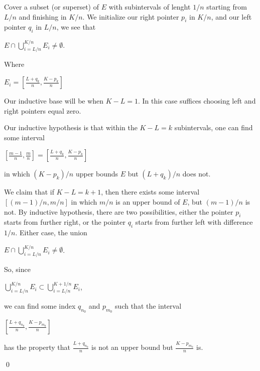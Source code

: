 \documentclass{article}
\theoremstyle{remark}
\begin{document}
\begin{enumerate}
            Cover a subset (or superset) of $E$ with subintervals of lenght $1/n$ starting from $L/n$ and finishing in $K/n$. We initialize our right pointer $p_i$ in $K/n$, and our left 
            pointer $q_i$ in $L/n$, we see that
            \begin{center}
                $\displaystyle E \cap \bigcup_{i=L/n}^{K/n} E_i \neq \emptyset$.
            \end{center}
            Where
            \begin{center}
                $\displaystyle E_i = \left[\frac{L+q_k}{n} , \frac{K-p_k}{n} \right]$
            \end{center}

            Our inductive base will be when $K-L = 1$. In this case suffices choosing left and right pointers equal zero.

            Our inductive hypothesis is that within the $K-L = k$ subintervals, one can find 
            some interval
            \begin{center}
                $\displaystyle \left[\frac{m-1}{n} , \frac{m}{n} \right] = \left[\frac{L+q_k}{n} , \frac{K-p_k}{n} \right]$
            \end{center}
            in which $(K-p_k)/n$ upper bounds $E$ but $(L+q_k)/n$ does not.

            We claim that if $K-L = k+1$, then there exists some interval $\left[(m-1)/n, m/n\right]$ in which $m/n$ is an upper bound of $E$, but
            $(m-1)/n$ is not.
            By inductive hypothesis, there are two possibilities, either the pointer $p_i$ starts from further right, or the pointer $q_i$
            starts from further left with difference $1/n$.
            Either case, the union 
            \begin{center}
                $\displaystyle E \cap \bigcup_{i=L/n}^{K/n} E_i \neq \emptyset$.
            \end{center}
            So, since
            \begin{center}
                $\displaystyle \bigcup_{i=L/n}^{K/n} E_i \subset \bigcup_{i=L/n}^{K+1/n} E_i$,
            \end{center}
            we can find some index $q_{n_0}$ and $p_{m_0}$ such that the interval
            \begin{center}
                $\displaystyle \left[\frac{L+q_{n_0}}{n} , \frac{K-p_{m_0}}{n} \right]$
            \end{center}
            has the property that $\frac{L+q_{n_0}}{n}$ is not an upper bound but $\frac{K-p_{m_0}}{n}$ is.
            \begin{flushright}
                \qed
            \end{flushright}


\end{enumerate}
\end{document}
